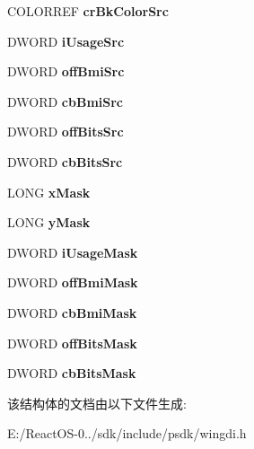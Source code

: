 \begin{DoxyCompactItemize}
\item 
\mbox{\label{structtag_e_m_r_p_l_g_b_l_t_a8e69a78dfa6fbdc6cd70d9714f770f55}} 
C\+O\+L\+O\+R\+R\+EF {\bfseries cr\+Bk\+Color\+Src}
\item 
\mbox{\label{structtag_e_m_r_p_l_g_b_l_t_a6c90280ee14196e9e301ba02caed33c6}} 
D\+W\+O\+RD {\bfseries i\+Usage\+Src}
\item 
\mbox{\label{structtag_e_m_r_p_l_g_b_l_t_aa47fde464885a7c5b470da5069c5f085}} 
D\+W\+O\+RD {\bfseries off\+Bmi\+Src}
\item 
\mbox{\label{structtag_e_m_r_p_l_g_b_l_t_ab7e55f063b5fc1461376bdd82903a7d0}} 
D\+W\+O\+RD {\bfseries cb\+Bmi\+Src}
\item 
\mbox{\label{structtag_e_m_r_p_l_g_b_l_t_a4df1c01a4e816b4abaff3d7e49cac8ce}} 
D\+W\+O\+RD {\bfseries off\+Bits\+Src}
\item 
\mbox{\label{structtag_e_m_r_p_l_g_b_l_t_ab71c548965827fc8675b25ab7e9f4f2f}} 
D\+W\+O\+RD {\bfseries cb\+Bits\+Src}
\item 
\mbox{\label{structtag_e_m_r_p_l_g_b_l_t_a2b92bfa7b8fd2cdf106a20be2bfcfcac}} 
L\+O\+NG {\bfseries x\+Mask}
\item 
\mbox{\label{structtag_e_m_r_p_l_g_b_l_t_ad7cb251208fec0b0cb1ee489a7ec17d4}} 
L\+O\+NG {\bfseries y\+Mask}
\item 
\mbox{\label{structtag_e_m_r_p_l_g_b_l_t_ae6fd78b2e7292385c8f3280b4a9e66d8}} 
D\+W\+O\+RD {\bfseries i\+Usage\+Mask}
\item 
\mbox{\label{structtag_e_m_r_p_l_g_b_l_t_a1139a90a5396beba3945b410f73f00c2}} 
D\+W\+O\+RD {\bfseries off\+Bmi\+Mask}
\item 
\mbox{\label{structtag_e_m_r_p_l_g_b_l_t_a3e1ec845e1f76b056d76794e9fcdbb16}} 
D\+W\+O\+RD {\bfseries cb\+Bmi\+Mask}
\item 
\mbox{\label{structtag_e_m_r_p_l_g_b_l_t_add10c6cfaff4c7313badb54b64ea08f0}} 
D\+W\+O\+RD {\bfseries off\+Bits\+Mask}
\item 
\mbox{\label{structtag_e_m_r_p_l_g_b_l_t_a25c03f3fb07e56dcd6507d07a12071cb}} 
D\+W\+O\+RD {\bfseries cb\+Bits\+Mask}
\end{DoxyCompactItemize}


该结构体的文档由以下文件生成\+:\begin{DoxyCompactItemize}
\item 
E\+:/\+React\+O\+S-\/0../sdk/include/psdk/wingdi.\+h\end{DoxyCompactItemize}
